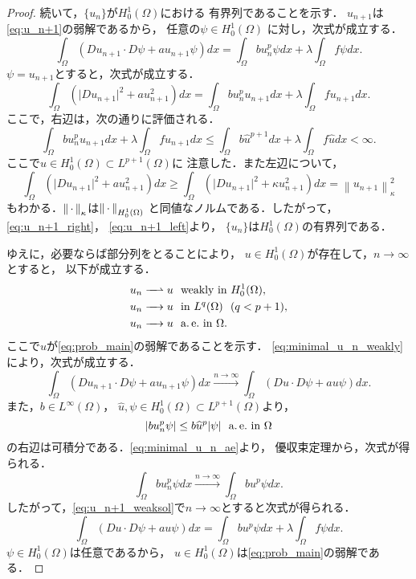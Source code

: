 \begin{proof}
 続いて，$\{u_n\}$が$H_0^1(\Omega)$における
 有界列であることを示す．
 $u_{n+1}$は\eqref{eq:u_n+1}の弱解であるから，
 任意の$\psi \in H_0^1(\Omega)$
 に対し，次式が成立する．
 \begin{equation}
  \int_\Omega (Du_{n+1} \cdot D\psi + a u_{n+1} \psi) dx 
   = \int_\Omega bu_n^p \psi dx + \lambda \int_\Omega f\psi dx.
   \label{eq:u_n+1_weaksol}
 \end{equation}
 $\psi = u_{n+1}$とすると，次式が成立する．
 \[
 \int_\Omega (\lvert Du_{n+1} \rvert^2 
 + a u_{n+1} ^2) dx 
 = \int_\Omega bu_n^p u_{n+1} dx 
 + \lambda \int_\Omega f u_{n+1} dx.
 \]
 ここで，右辺は，次の通りに評価される．
 \begin{equation}
  \int_\Omega bu_n^p u_{n+1} dx 
   + \lambda \int_\Omega f u_{n+1} dx
 \leq \int_\Omega b\hat{u}^{p+1} dx + \lambda
   \int_\Omega f \hat{u} dx < \infty. \label{eq:u_n+1_right}
 \end{equation}
 ここで$\hat{u} \in H_0^1(\Omega) \subset L^{p+1}(\Omega)$に
 注意した．また左辺について，
 \begin{equation}
  \int_\Omega (\lvert Du_{n+1} \rvert^2 
   + a u_{n+1}^2) dx 
 \geq \int_\Omega \left( \lvert Du_{n+1} \rvert^2 + \kappa
         u_{n+1} ^2 \right) dx = \left\| u_{n+1} 
                                                \right\|_{\kappa}^2
  \label{eq:u_n+1_left}
 \end{equation}
 もわかる．$\left\|\, \cdot \, \right\|_\kappa$は$\left\|\, \cdot \, \right\|_{H_0^1(\Omega)}$
 と同値なノルムである．したがって，\eqref{eq:u_n+1_right}，
 \eqref{eq:u_n+1_left}より，
 $\{u_n\}$は$H_0^1(\Omega)$の有界列である．

 ゆえに，必要ならば部分列をとることにより，
 $u \in H_0^1(\Omega)$が存在して，$n \to \infty$とすると，
 以下が成立する．
 \begin{align}
  u_n \xrightharpoonup{ \mbox{ ~ } } u & \ \ \text{weakly~} \tin
  H_0^1(\Omega), \label{eq:minimal_u_n_weakly} \\
  u_n \xrightarrow{ \mbox{ ~ } } u & \ \ \tin L^q(\Omega) \notag \ \
   (q < p+1), \\
  u_n \xrightarrow{ \mbox{ ~ } } u & \ \ \ae \tin \Omega. 
    \label{eq:minimal_u_n_ae}
 \end{align}
 ここで$u$が\ref{eq:prob_main}の弱解であることを示す．
 \eqref{eq:minimal_u_n_weakly}により，次式が成立する．
 \[
 \int_\Omega (Du_{n+1} \cdot D\psi + a u_{n+1} \psi) dx
 \xrightarrow{n \to \infty}
 \int_\Omega (Du \cdot D\psi + a u \psi) dx.
 \]
 また，$b \in L^\infty(\Omega)$，
 $\hat{u}, \psi \in H_0^1(\Omega) \subset L^{p+1}(\Omega)$より，
 \[
  \left\lvert bu_n^p \psi \right\rvert \leq b \widehat{u}^p \lvert\psi\rvert \ \ \text{a.\,e.}~
 \text{in}~ \Omega
 \]
 の右辺は可積分である．\eqref{eq:minimal_u_n_ae}より，
 優収束定理から，次式が得られる．
 \[
 \int_\Omega bu_n^p \psi dx \xrightarrow{n \to \infty} 
 \int_\Omega bu^p \psi dx.
 \]
 したがって，\eqref{eq:u_n+1_weaksol}で$n \to \infty$とすると次式が得られる．
 \begin{equation}
  \int_\Omega (Du \cdot D\psi + a u \psi) dx 
   = \int_\Omega bu^p \psi dx + \lambda \int_\Omega f\psi dx.
   \label{eq:minimal_u_weaksol}
 \end{equation}
 $\psi \in H_0^1(\Omega)$は任意であるから，
 $u \in H_0^1(\Omega)$は\ref{eq:prob_main}の弱解である．
 

\end{proof}
